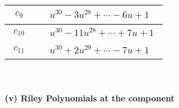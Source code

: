 \documentclass[1p]{elsarticle_modified}
\theoremstyle{definition}
\begin{document}
\begin{tabular}{m{50pt}|m{274pt}}
\hline $$\begin{aligned}c_{9}\end{aligned}$$&$\begin{aligned}
&u^{30}-3 u^{28}+\cdots-6 u+1
\end{aligned}$\\
\hline $$\begin{aligned}c_{10}\end{aligned}$$&$\begin{aligned}
&u^{30}-11 u^{28}+\cdots+7 u+1
\end{aligned}$\\
\hline $$\begin{aligned}c_{11}\end{aligned}$$&$\begin{aligned}
&u^{30}+2 u^{29}+\cdots-7 u+1
\end{aligned}$\\
\hline
\end{tabular}\\~\\
\newpage\renewcommand{\arraystretch}{1}
\flushleft \textbf{(v) Riley Polynomials at the component}\newline \\
\end{document}
